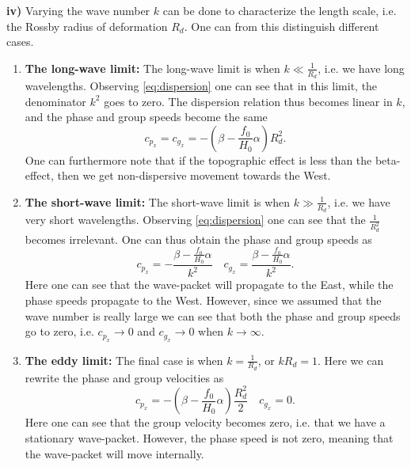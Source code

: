 \newpage
\textbf{iv)} Varying the wave number $k$ can be done to characterize the length scale, i.e. the Rossby radius of deformation $R_d$. One can from this distinguish different cases. 
\begin{enumerate}
    \item \textbf{The long-wave limit:} The long-wave limit is when $k\ll\tfrac{1}{R_d}$, i.e. we have long wavelengths. Observing \autoref{eq:dispersion} one can see that in this limit, the denominator $k^2$ goes to zero. The dispersion relation thus becomes linear in $k$, and the phase and group speeds become the same
    \begin{equation}
        c_{p_x}=c_{g_x}= -\left(\beta-\frac{f_0}{H_0}{\alpha}\right)R_d^2.
    \end{equation}
    One can furthermore note that if the topographic effect is less than the beta-effect, then we get non-dispersive movement towards the West. 

    \item \textbf{The short-wave limit:} The short-wave limit is when $k\gg\tfrac{1}{R_d}$, i.e. we have very short wavelengths. Observing \autoref{eq:dispersion} one can see that the $\tfrac{1}{R_d^2}$ becomes irrelevant. One can thus obtain the phase and group speeds as 
    \begin{equation}
        c_{p_x}= -\frac{\beta-\frac{f_0}{H_0}\alpha}{k^2}  \quad c_{g_x}=\frac{\beta-\frac{f_0}{H_0}\alpha}{k^2}.
    \end{equation}
    Here one can see that the wave-packet will propagate to the East, while the phase speeds propagate to the West. However, since we assumed that the wave number is really large we can see that both the phase and group speeds go to zero, i.e. $c_{p_x}\rightarrow0$ and $c_{g_x}\rightarrow0$ when $k\rightarrow\infty$.

    \item \textbf{The eddy limit:} The final case is when $k=\tfrac{1}{R_d}$, or $kR_d=1$. Here we can rewrite the phase and group velocities as 
    \begin{equation}
        c_{p_x}= -\left(\beta-\frac{f_0}{H_0}\alpha\right)\frac{R_d^2}{2}  \quad c_{g_x}=0.
    \end{equation}
    Here one can see that the group velocity becomes zero, i.e. that we have a stationary wave-packet. However, the phase speed is not zero, meaning that the wave-packet will move internally. 
\end{enumerate}

